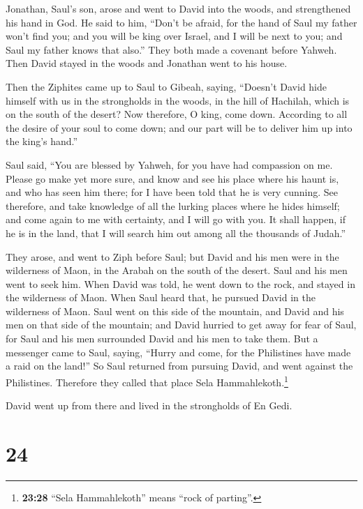  Jonathan, Saul's son, arose and went to David into the
woods, and strengthened his hand in God.  He said to him,
``Don't be afraid, for the hand of Saul my father won't find you; and
you will be king over Israel, and I will be next to you; and Saul my
father knows that also.''  They both made a covenant
before Yahweh. Then David stayed in the woods and Jonathan went to his
house.

 Then the Ziphites came up to Saul to Gibeah, saying,
``Doesn't David hide himself with us in the strongholds in the woods, in
the hill of Hachilah, which is on the south of the desert?
 Now therefore, O king, come down. According to all the
desire of your soul to come down; and our part will be to deliver him up
into the king's hand.''

 Saul said, ``You are blessed by Yahweh, for you have had
compassion on me.  Please go make yet more sure, and know
and see his place where his haunt is, and who has seen him there; for I
have been told that he is very cunning.  See therefore,
and take knowledge of all the lurking places where he hides himself; and
come again to me with certainty, and I will go with you. It shall
happen, if he is in the land, that I will search him out among all the
thousands of Judah.''

 They arose, and went to Ziph before Saul; but David and
his men were in the wilderness of Maon, in the Arabah on the south of
the desert.  Saul and his men went to seek him. When
David was told, he went down to the rock, and stayed in the wilderness
of Maon. When Saul heard that, he pursued David in the wilderness of
Maon.  Saul went on this side of the mountain, and David
and his men on that side of the mountain; and David hurried to get away
for fear of Saul, for Saul and his men surrounded David and his men to
take them.  But a messenger came to Saul, saying, ``Hurry
and come, for the Philistines have made a raid on the land!''
 So Saul returned from pursuing David, and went against
the Philistines. Therefore they called that place Sela
Hammahlekoth.\footnote{\textbf{23:28} ``Sela Hammahlekoth'' means ``rock
  of parting''.}

 David went up from there and lived in the strongholds of
En Gedi.

\hypertarget{section-23}{%
\section{24}\label{section-23}}


